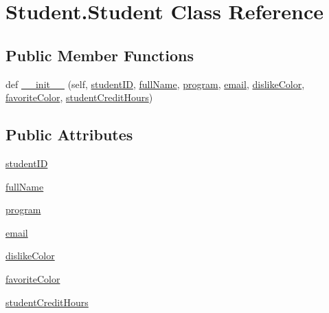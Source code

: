 \hypertarget{class_student_1_1_student}{}\section{Student.\+Student Class Reference}
\label{class_student_1_1_student}
\subsection*{Public Member Functions}
\begin{DoxyCompactItemize}
\item 
def \hyperlink{class_student_1_1_student_a8069666ff37178cf2cf5f72792331ad4}{\+\_\+\+\_\+init\+\_\+\+\_\+} (self, \hyperlink{class_student_1_1_student_ad0ff2ef29969f92c737112ff76e1eb23}{student\+I\+D}, \hyperlink{class_student_1_1_student_a6377fa53bde2bd9a09402417a970cfe0}{full\+Name}, \hyperlink{class_student_1_1_student_afef32339c4759ebe384fa3fe43e0f947}{program}, \hyperlink{class_student_1_1_student_a15646360e956aadb3d60f00795d2190e}{email}, \hyperlink{class_student_1_1_student_ace53802842808ff3f2eca0702e6dec28}{dislike\+Color}, \hyperlink{class_student_1_1_student_a0225aab3458da940a21b332cdcba3fce}{favorite\+Color}, \hyperlink{class_student_1_1_student_a7500ff9d6e8b1e9795aadbf6b375ae59}{student\+Credit\+Hours})
\end{DoxyCompactItemize}
\subsection*{Public Attributes}
\begin{DoxyCompactItemize}
\item 
\hyperlink{class_student_1_1_student_ae09b19677b0b71c7977702f7f85266f1}{student\+I\+D}
\item 
\hyperlink{class_student_1_1_student_a42c4e512c2ef23b9c3fbadb1463be825}{full\+Name}
\item 
\hyperlink{class_student_1_1_student_ac059f070275775de6e9f859d0927022e}{program}
\item 
\hyperlink{class_student_1_1_student_a136f11ba8b93b9c445e32acf8769f301}{email}
\item 
\hyperlink{class_student_1_1_student_ab15343e6ee78653c95b64937395048b2}{dislike\+Color}
\item 
\hyperlink{class_student_1_1_student_a3b4a68fc25418358f8c7eaac45bcb0a5}{favorite\+Color}
\item 
\hyperlink{class_student_1_1_student_ae2833e95922c2320ceade64dee9b66d0}{student\+Credit\+Hours}
\end{DoxyCompactItemize}
